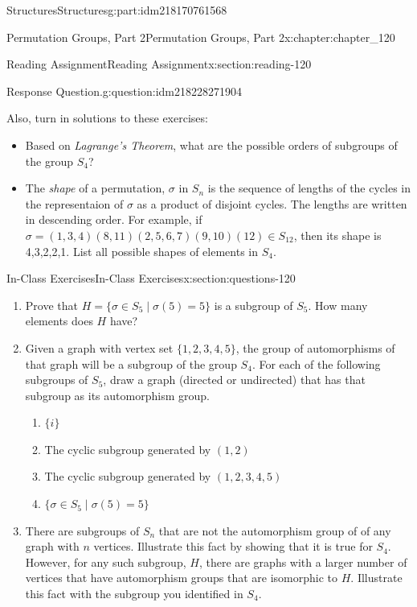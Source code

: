 \documentclass[oneside,10pt,]{book}
\numberwithin{equation}{section}
\begin{document}
\begin{partptx}{Structures}{}{Structures}{}{}{g:part:idm218170761568}
\begin{chapterptx}{Permutation Groups, Part 2}{}{Permutation Groups, Part 2}{}{}{x:chapter:chapter_120}
\begin{sectionptx}{Reading Assignment}{}{Reading Assignment}{}{}{x:section:reading-120}
\begin{question}{Response Question.}{g:question:idm218228271904}
\end{question}
Also, turn in solutions to these exercises:%
\begin{itemize}[label=\textbullet]
\item{}Based on \emph{Lagrange's Theorem}, what are the possible orders of subgroups of the group \(S_4\)?%
\item{}The \emph{shape} of a permutation, \(\sigma\) in \(S_n\) is the sequence of lengths of the cycles in the representaion of \(\sigma\) as a product of disjoint cycles. The lengths are written in descending order.  For example, if \(\sigma = (1,3,4)(8,11)(2,5,6,7)(9,10)(12) \in S_{12}\), then its shape is  4,3,2,2,1.  List all possible shapes of elements in \(S_4\).%
\end{itemize}
%
\end{sectionptx}
%
%
\typeout{************************************************}
\typeout{************************************************}
%
\begin{sectionptx}{In-Class Exercises}{}{In-Class Exercises}{}{}{x:section:questions-120}
%
\begin{enumerate}[label=\arabic*.]
\item{}Prove that \(H =\{\sigma \in S_5 \mid \sigma(5)=5 \}\) is a subgroup of \(S_5\).  How many elements does \(H\) have?%
\item{}Given a graph with vertex set \(\{1, 2, 3, 4, 5\}\), the group of automorphisms of that graph will be a subgroup of the group  \(S_4\). For each of the following subgroups of \(S_5\), draw a graph (directed or undirected) that has that subgroup as its automorphism group.%
\begin{enumerate}[label=(\alph*)]
\item{}\(\displaystyle \{i\}\)%
\item{}The cyclic subgroup generated by \((1,2)\)%
\item{}The cyclic subgroup generated by \((1,2,3,4,5)\)%
\item{}\(\displaystyle \{\sigma \in S_5 \mid \sigma(5)=5  \}\)%
\end{enumerate}
%
\item{}There are subgroups of \(S_n\) that are not the automorphism group of of any graph with \(n\) vertices.  Illustrate this fact by showing that it is true for \(S_4\).  However, for any such subgroup, \(H\), there are graphs with a larger number of vertices that have automorphism groups that are isomorphic to \(H\). Illustrate this fact with the subgroup you identified in \(S_4\).%

\end{enumerate}
\end{sectionptx}
\end{chapterptx}
\end{partptx}
\end{document}
